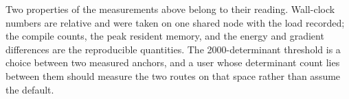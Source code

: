 Two properties of the measurements above belong to their reading.
Wall-clock numbers are relative and were taken on one shared node with
the load recorded; the compile counts, the peak resident memory, and
the energy and gradient differences are the reproducible quantities.
The 2000-determinant threshold is a choice between two measured
anchors, and a user whose determinant count lies between them should
measure the two routes on that space rather than assume the default.

